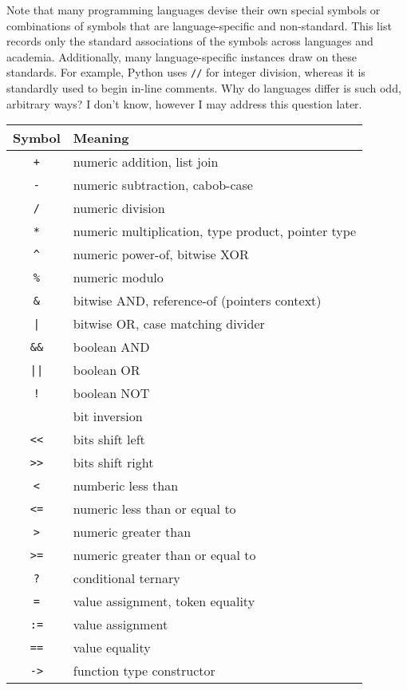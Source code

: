 \documentclass{article}
\newcommand{\code}[1]{\texttt{#1}}
\begin{document}
	Note that many programming languages devise their own special symbols or combinations of symbols that are language-specific and non-standard. This list records only the standard associations of the symbols across languages and academia. Additionally, many language-specific instances draw on these standards. For example, Python uses \code{//} for integer division, whereas it is standardly used to begin in-line comments. Why do languages differ is such odd, arbitrary ways? I don't know, however I may address this question later.

	\vspace{20px}
	
	\begin{tabular}{c|l}
		Symbol  & Meaning \\ \hline
		\code{+} 	&numeric addition, list join \\
		\code{-} 	&numeric subtraction, cabob-case \\
		\code{/} 	&numeric division \\
		\code{*} 	&numeric multiplication, type product, pointer type \\
		\code{\textasciicircum} &numeric power-of, bitwise XOR \\
		\code{\%}   &numeric modulo \\
		\code{\&}   	&bitwise AND, reference-of (pointers context) \\
		\code{|}    	&bitwise OR, case matching divider \\
		\code{\&\&} 	&boolean AND \\
		\code{||}	&boolean OR \\
		\code{!} 		&boolean NOT\\
		\texttildelow & bit inversion \\
		\code{<<}	&bits shift left \\
		\code{>>}	&bits shift right \\
		\code{<}		&numberic less than \\
		\code{<=}	&numeric less than or equal to\\
		\code{>}		&numeric greater than \\
		\code{>=} 	&numeric greater than or equal to\\
		\code{?}		&conditional ternary \\
		\code{=}		&value assignment, token equality \\
		\code{:=}	&value assignment \\
		\code{==}	&value equality \\
		\code{->}	&function type constructor \\

\end{tabular}
\end{document}
